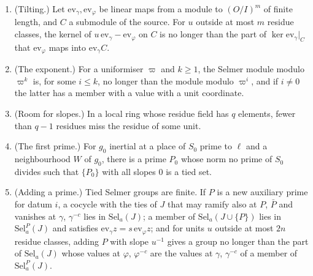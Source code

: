 \begin{lemma}\label{lem:descent-tools}
\begin{enumerate}[label=\textup{(\alph*)}]
\item (Tilting.) Let $\mathrm{ev}_\gamma,\mathrm{ev}_\varphi$ be linear maps from a module to $(O/I)^m$ of finite length, and $C$ a submodule of the source. For $u$ outside at most $m$ residue classes, the kernel of $u\,\mathrm{ev}_\gamma-\mathrm{ev}_\varphi$ on $C$ is no longer than the part of $\ker\mathrm{ev}_\gamma|_C$ that
$\mathrm{ev}_\varphi$ maps into $\mathrm{ev}_\gamma C$.
\item (The exponent.) For a uniformiser $\varpi$ and $k\ge1$, the Selmer module modulo $\varpi^k$ is, for some $i\le k$, no longer than the module modulo $\varpi^i$, and if $i\ne0$ the latter has a member with a value with a unit coordinate.
\item (Room for slopes.) In a local ring whose residue field has $q$ elements, fewer than $q-1$ residues miss the residue of some unit.
\item (The first prime.) For $g_0$ inertial at a place of $S_0$ prime to $\ell$ and a neighbourhood $W$ of $g_0$, there is a prime $P_0$ whose norm no prime of $S_0$ divides such that $\{P_0\}$ with all slopes $0$ is a tied set.
\item (Adding a prime.) Tied Selmer groups are finite. If $P$ is a new auxiliary prime for datum $i$, a cocycle with the ties of $J$ that may ramify also at $P$, $\bar P$ and vanishes at $\gamma$, $\gamma^{-c}$ lies in $\mathrm{Sel}_a(J)$; a member of $\mathrm{Sel}_a(J\cup\{P\})$ lies in $\mathrm{Sel}^P_a(J)$ and satisfies $\mathrm{ev}_\gamma z=s\,\mathrm{ev}_\varphi z$;
and for units $u$ outside at most $2n$ residue classes, adding $P$ with slope $u^{-1}$ gives a group no longer than the part of $\mathrm{Sel}_a(J)$ whose values at $\varphi$, $\varphi^{-c}$ are the values at $\gamma$, $\gamma^{-c}$ of a member of $\mathrm{Sel}^P_a(J)$.
\end{enumerate}
\end{lemma}

